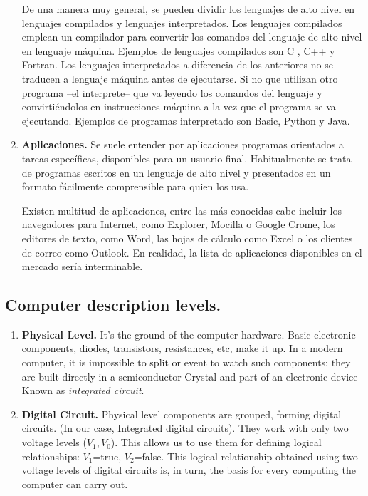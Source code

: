 \begin{paracol}{2}
\begin{enumerate}
De una manera muy general, se pueden dividir los lenguajes de alto nivel en lenguajes compilados y lenguajes interpretados. Los lenguajes compilados emplean un compilador para convertir los comandos del lenguaje de alto nivel en lenguaje máquina. Ejemplos de lenguajes compilados son C , C++ y Fortran. Los lenguajes interpretados a diferencia de los anteriores no se traducen a lenguaje máquina antes de ejecutarse. Si no que utilizan otro programa --el interprete-- que va leyendo los comandos del lenguaje y convirtiéndolos en instrucciones máquina a la vez que el programa se va ejecutando. Ejemplos de programas interpretado son Basic, Python y Java.

\item \textbf{Aplicaciones.}  Se suele entender por aplicaciones programas orientados a tareas específicas, disponibles para un usuario final. Habitualmente se trata de programas escritos en un lenguaje de alto nivel y presentados en un formato fácilmente comprensible para quien los usa.

Existen multitud de aplicaciones, entre las más conocidas cabe incluir los navegadores para Internet, como Explorer, Mocilla o Google Crome, los editores de texto, como Word, las hojas de cálculo como Excel o los clientes de correo como Outlook. En realidad, la lista de aplicaciones disponibles en el mercado sería interminable. 
\end{enumerate}

\switchcolumn
\subsection{Computer description levels.}
\begin{enumerate}
\item \textbf{Physical Level.} It's the ground of the computer hardware. Basic electronic components, diodes, transistors, resistances, etc, make it up. In a modern computer, it is impossible to split or event to watch such components: they are built directly in a semiconductor Crystal and part\; of an electronic device Known as \emph{integrated circuit}.

\item \textbf{Digital Circuit.}
Physical level components are grouped, forming digital circuits. (In our case, Integrated digital circuits). They work with only two voltage levels ($V_1, V_0$). This allows us to use them for defining logical relationships: $V_1$=true, $V_2$=false. This logical relationship obtained using two voltage levels of digital circuits is, in turn, the basis for every computing the computer can carry out.


\end{enumerate}
\end{paracol}
